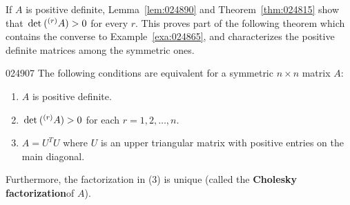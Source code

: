 If $A$ is positive definite, Lemma~\ref{lem:024890} and Theorem~\ref{thm:024815} show that $\thinspace\operatorname{det\medspace}(^{(r)}A) > 0$ for every $r$. This proves part of the following theorem which contains the converse to Example~\ref{exa:024865}, and characterizes the positive definite matrices among the symmetric ones.


\begin{theorem}{}{024907}
The following conditions are equivalent for a symmetric $n \times n$ matrix $A$:

\vspace*{-1em}
\begin{enumerate}
\item $A$ is positive definite.

\item $\thinspace\operatorname{det\medspace}(^{(r)}A) > 0$ for each $r = 1, 2, \dots, n$.

\item $A = U^{T}U$ where $U$ is an upper triangular matrix with positive entries on the main diagonal.
\end{enumerate}

Furthermore, the factorization in (3) is unique (called the \textbf{Cholesky factorization}\footnotemark of $A$).
\end{theorem}


